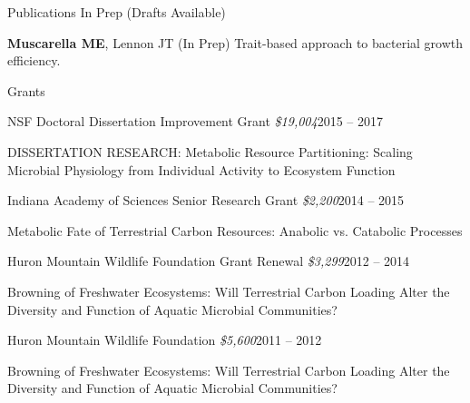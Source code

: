\documentclass{resume} %
\begin{document}
\begin{rSection}{Publications In Prep (Drafts Available)}

{\bf Muscarella ME}, Lennon JT (In Prep) Trait-based approach to bacterial
growth efficiency.

\end{rSection}

\pagebreak


\begin{rSection}{Grants}

    \begin{rSubsection}{NSF Doctoral Dissertation Improvement Grant
      {\normalfont \em \$19,004}}{2015 -- 2017}{}{}
      \item DISSERTATION RESEARCH: Metabolic Resource Partitioning: Scaling
      Microbial Physiology from Individual Activity to Ecosystem Function
    \end{rSubsection}

    \begin{rSubsection}{Indiana Academy of Sciences Senior Research Grant
      {\normalfont \em \$2,200}}{2014 -- 2015}{}{}
      \item Metabolic Fate of Terrestrial Carbon Resources: Anabolic vs.
      Catabolic Processes
    \end{rSubsection}

    \begin{rSubsection}{Huron Mountain Wildlife Foundation Grant Renewal
      {\normalfont \em \$3,299}}{2012 -- 2014}{}{}
      \item Browning of Freshwater Ecosystems: Will Terrestrial Carbon Loading
      Alter the Diversity and Function of Aquatic Microbial Communities?
    \end{rSubsection}

    \begin{rSubsection}{Huron Mountain Wildlife Foundation
      {\normalfont \em \$5,600}}{2011 -- 2012}{}{}
      \item Browning of Freshwater Ecosystems: Will Terrestrial Carbon Loading
      Alter the Diversity and Function of Aquatic Microbial Communities?
    \end{rSubsection}

\end{rSection}
\end{document}
